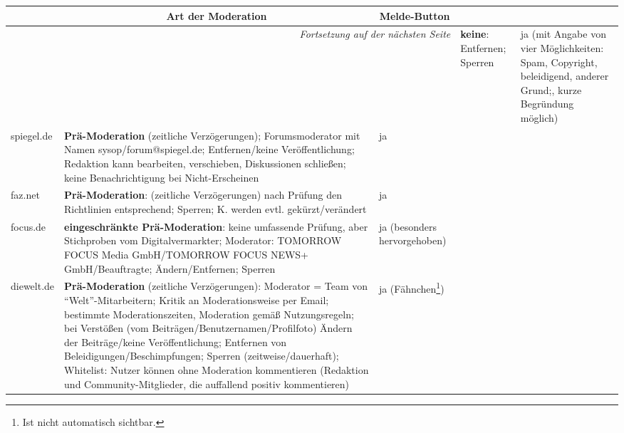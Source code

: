 
\begin{landscape} \footnotesize
\begin{longtable}{l|p{110mm}p{50mm}}

  \multicolumn{1}{c}{} &
  \multicolumn{1}{c}{Art der Moderation} &
  \multicolumn{1}{c}{Melde-Button} \\\hline\hline
  \endhead

  \hline \multicolumn{3}{r}{\emph{Fortsetzung auf der nächsten Seite}}
  \endfoot

  \hline
  \endlastfoot

bild.de &
  {\bf keine}: Entfernen; Sperren &
  ja (mit Angabe von vier Möglichkeiten: Spam, Copyright, beleidigend, anderer
  Grund;, kurze Begründung möglich) \\\hline

spiegel.de &
   {\bf Prä-Moderation} (zeitliche Verzögerungen); Forumsmoderator mit Namen
  sysop/forum@spiegel.de; Entfernen/keine Veröffentlichung; Redaktion kann
  bearbeiten, verschieben, Diskussionen schließen; keine Benachrichtigung bei
  Nicht-Erscheinen &
  ja \\\hline

faz.net &
   {\bf Prä-Moderation}: (zeitliche Verzögerungen) nach Prüfung den Richtlinien
  entsprechend; Sperren; K. werden evtl. gekürzt/verändert &
  ja \\\hline

focus.de &
   {\bf eingeschränkte Prä-Moderation}: keine umfassende Prüfung, aber Stichproben vom
  Digitalvermarkter; Moderator: TOMORROW FOCUS Media GmbH/TOMORROW FOCUS NEWS+
  GmbH/Beauftragte; Ändern/Entfernen; Sperren &
  ja (besonders hervorgehoben) \\\hline

diewelt.de &
   {\bf Prä-Moderation} (zeitliche Verzögerungen): Moderator = Team von
  ``Welt''-Mitarbeitern; Kritik an Moderationsweise per Email; bestimmte
  Moderationszeiten, Moderation gemäß Nutzungsregeln; bei Verstößen (vom
  Beiträgen/Benutzernamen/Profilfoto) Ändern der Beiträge/keine
  Veröffentlichung; Entfernen von Beleidigungen/Beschimpfungen; Sperren
  (zeitweise/dauerhaft); Whitelist: Nutzer können ohne Moderation kommentieren
  (Redaktion und Community-Mitglieder, die auffallend positiv kommentieren) &
  ja (Fähnchen\footnote{Ist nicht automatisch sichtbar.}) \\\hline


\end{longtable}
\end{landscape}
